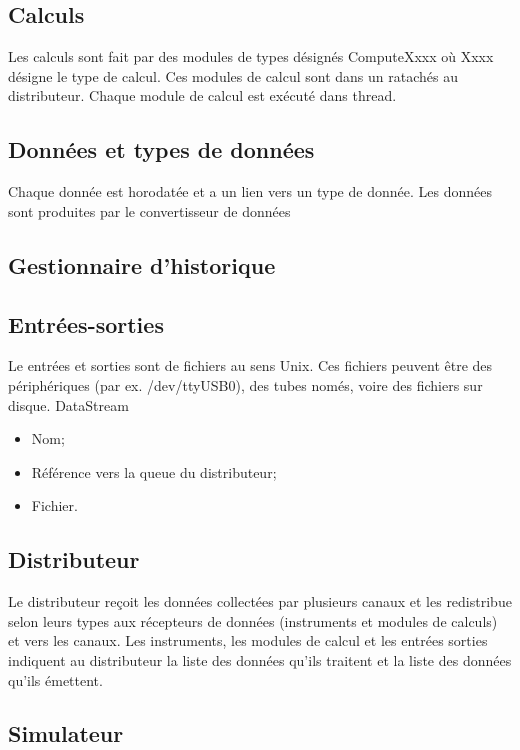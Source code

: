\documentclass[a4paper,11pt]{report}
\begin{document}
\subsection{Calculs}

Les calculs sont fait par des modules de types désignés ComputeXxxx
où Xxxx désigne le type de calcul. Ces modules de calcul sont dans
un ratachés au distributeur. Chaque module de calcul est exécuté dans thread.  



\subsection{Données et types de données}

Chaque donnée est horodatée et a un lien vers un type de donnée.
Les données sont produites par le convertisseur de données 


\subsection{Gestionnaire d'historique}


\subsection{Entrées-sorties}
Le entrées et sorties sont de fichiers au sens Unix.
Ces fichiers peuvent être des périphériques (par ex. /dev/ttyUSB0), des tubes només,
voire des fichiers sur disque.
DataStream
\begin{itemize}
	\item Nom;
	\item Référence vers la queue du distributeur;
	\item Fichier.
\end{itemize}

\subsection{Distributeur}

Le distributeur reçoit les données collectées par plusieurs canaux et les redistribue
selon leurs types aux récepteurs de données (instruments et modules de calculs)
et vers les canaux.
Les instruments, les modules de calcul et les entrées sorties indiquent au distributeur
la liste des données qu'ils traitent et la liste des données qu'ils émettent.

\subsection{Simulateur}
\end{document}
